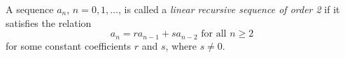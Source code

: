 \begin{dfn}
A sequence $a_n$, $n = 0, 1, \ldots$, is called a \emph{linear recursive sequence of order 2} if
it satisfies the relation
\begin{equation}
\label{eqn:LinRec2}
a_n = ra_{n-1} + sa_{n-2} \text{ for all } n \ge 2
\end{equation}
for some constant coefficients $r$ and $s$, where $s \ne 0$.
\end{dfn}